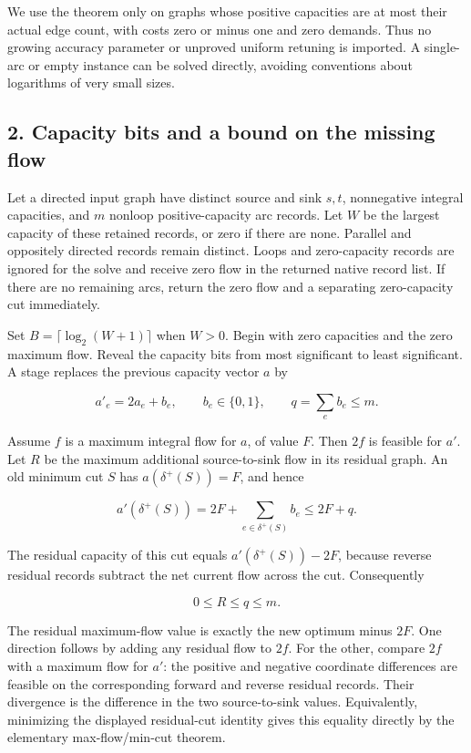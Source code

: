 We use the theorem only on graphs whose positive capacities are at most their actual edge count, with costs zero or minus one and zero demands. Thus no growing accuracy parameter or unproved uniform retuning is imported. A single-arc or empty instance can be solved directly, avoiding conventions about logarithms of very small sizes.

\hypertarget{af-bcf24248b3-capacity-bits-and-a-bound-on-the-missing-flow}{%
\subsection{2. Capacity bits and a bound on the missing flow}\label{af-bcf24248b3-capacity-bits-and-a-bound-on-the-missing-flow}}

Let a directed input graph have distinct source and sink \(s,t\), nonnegative integral capacities, and \(m\) nonloop positive-capacity arc records. Let \(W\) be the largest capacity of these retained records, or zero if there are none. Parallel and oppositely directed records remain distinct. Loops and zero-capacity records are ignored for the solve and receive zero flow in the returned native record list. If there are no remaining arcs, return the zero flow and a separating zero-capacity cut immediately.

Set \(B=\lceil\log_2(W+1)\rceil\) when \(W>0\). Begin with zero capacities and the zero maximum flow. Reveal the capacity bits from most significant to least significant. A stage replaces the previous capacity vector \(a\) by

\[
a'_e=2a_e+b_e,\qquad b_e\in\{0,1\},\qquad
q=\sum_e b_e\leq m.
\]

Assume \(f\) is a maximum integral flow for \(a\), of value \(F\). Then \(2f\) is feasible for \(a'\). Let \(R\) be the maximum additional source-to-sink flow in its residual graph. An old minimum cut \(S\) has \(a(\delta^+(S))=F\), and hence

\[
a'(\delta^+(S))
 =2F+\sum_{e\in\delta^+(S)}b_e
 \leq 2F+q.
\]

The residual capacity of this cut equals \(a'(\delta^+(S))-2F\), because reverse residual records subtract the net current flow across the cut. Consequently

\[
0\leq R\leq q\leq m.
\]

The residual maximum-flow value is exactly the new optimum minus \(2F\). One direction follows by adding any residual flow to \(2f\). For the other, compare \(2f\) with a maximum flow for \(a'\): the positive and negative coordinate differences are feasible on the corresponding forward and reverse residual records. Their divergence is the difference in the two source-to-sink values. Equivalently, minimizing the displayed residual-cut identity gives this equality directly by the elementary max-flow/min-cut theorem.


